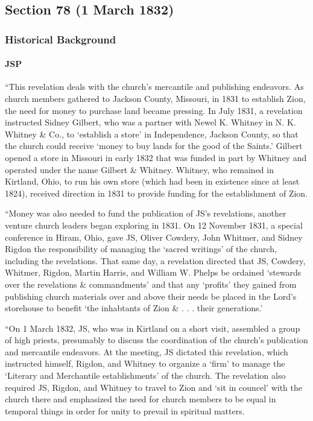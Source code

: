 \subsection{Section 78 (1 March 1832)}
	\label{DC78}
	
	\subsubsection{Historical Background}
		\label{DC78-HB}
		
		\paragraph{JSP}
		
			``This revelation deals with the church's mercantile and publishing endeavors. As church members gathered to Jackson County, Missouri, in 1831 to establish Zion, the need for money to purchase land became pressing. In July 1831, a revelation instructed Sidney Gilbert, who was a partner with Newel K. Whitney in N. K. Whitney \& Co., to `establish a store' in Independence, Jackson County, so that the church could receive `money to buy lands for the good of the Saints.' Gilbert opened a store in Missouri in early 1832 that was funded in part by Whitney and operated under the name Gilbert \& Whitney. Whitney, who remained in Kirtland, Ohio, to run his own store (which had been in existence since at least 1824), received direction in 1831 to provide funding for the establishment of Zion.
			
			``Money was also needed to fund the publication of JS's revelations, another venture church leaders began exploring in 1831. On 12 November 1831, a special conference in Hiram, Ohio, gave JS, Oliver Cowdery, John Whitmer, and Sidney Rigdon the responsibility of managing the `sacred writings' of the church, including the revelations. That same day, a revelation directed that JS, Cowdery, Whitmer, Rigdon, Martin Harris, and William W. Phelps be ordained `stewards over the revelations \& commandments' and that any `profits' they gained from publishing church materials over and above their needs be placed in the Lord's storehouse to benefit `the inhabtants of Zion \& . . . their generations.'
			
			``On 1 March 1832, JS, who was in Kirtland on a short visit, assembled a group of high priests, presumably to discuss the coordination of the church's publication and mercantile endeavors. At the meeting, JS dictated this revelation, which instructed himself, Rigdon, and Whitney to organize a `firm' to manage the `Literary and Merchantile establishments' of the church. The revelation also required JS, Rigdon, and Whitney to travel to Zion and `sit in councel' with the church there and emphasized the need for church members to be equal in temporal things in order for unity to prevail in spiritual matters.
			
